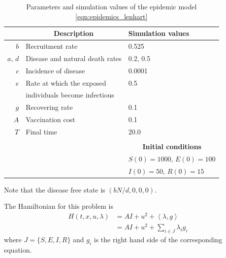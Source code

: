 \begin{table}[htb]
  \begin{center}
    \begin{tabular}{rll}
      \toprule
        & \multicolumn{1}{c}{\textbf{Description}} 
        & \textbf{Simulation values}
        \\
      \midrule
        $b$
          & Recruitment rate
          & \num{0.525}
        \\
        $a$, $d$ 
          & Disease and natural death rates
          & \num{0.2}, \num{0.5}
        \\
        $c$
          & Incidence of disease
          & \num{0.0001}
        \\
        $e$
          & Rate at which the exposed 
          & \num{0.5}
          \\
          & individuals become infectious
        \\
        $g$
          & Recovering rate
          & \num{0.1}
        \\
        $A$
          & Vaccination cost
          & \num{0.1}
        \\
        $T$
          & Final time
          & \num{20.0}
        \\
        \\
        && 
        \multicolumn{1}{c}{
          \textbf{Initial conditions}
        }
        \\
        \cmidrule{3-3}
          &&
            $S(0) = \num{1000}$, $E(0) = \num{100}$
          \\
          &&
            $I(0) = \num{50}$, $R(0) = \num{15}$
        \\
      \bottomrule
    \end{tabular}
    \caption{Parameters and simulation values of the epidemic model
      \eqref{eqn:epidemics_lenhart}}
    \label{tbl:epidemics_lenhart}
  \end{center}
\end{table}

 Note that the disease free state is 
$(bN/d,0,0,0)$.

The Hamiltonian for this problem is
\begin{align*}
    H(t,x,u,\lambda) &= AI + u^{2} + \left< \lambda , g \right> \\
                     &= AI + u^{2} + \sum_{i \in J} \lambda_{i}g_{i}
\end{align*}
where $J = \{S, E, I, R\}$ and $g_i$ is the right hand side of the corresponding
equation.

